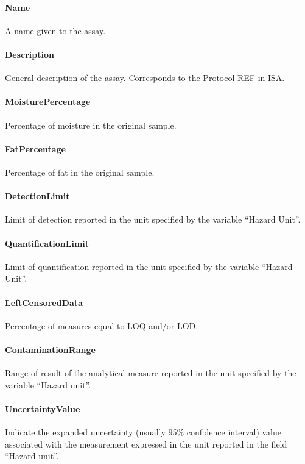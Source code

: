 \documentclass[a4paper]{report}
\begin{document}
\paragraph{Name}
A name given to the assay.

\paragraph{Description}
General description of the assay. Corresponds to the Protocol REF in ISA.

\paragraph{MoisturePercentage}
Percentage of moisture in the original sample.

\paragraph{FatPercentage}
Percentage of fat in the original sample.

\paragraph{DetectionLimit}
Limit of detection reported in the unit specified by the variable ``Hazard Unit''.

\paragraph{QuantificationLimit}
Limit of quantification reported in the unit specified by the variable ``Hazard Unit''.

\paragraph{LeftCensoredData}
Percentage of measures equal to LOQ and/or LOD.

\paragraph{ContaminationRange}
Range of result of the analytical measure reported in the unit specified by the variable ``Hazard unit''.

\paragraph{UncertaintyValue}
Indicate the expanded uncertainty (usually 95\% confidence interval) value associated with the measurement expressed in the unit reported in the field ``Hazard unit''.
\end{document}
